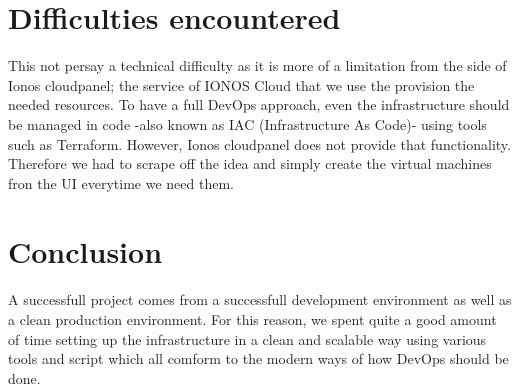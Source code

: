 \section{Difficulties encountered}
This not persay a technical difficulty as it is more of a limitation from the side of Ionos cloudpanel; the service of IONOS Cloud that we use the provision the needed resources.
To have a full DevOps approach, even the infrastructure should be managed in code -also known as IAC (Infrastructure As Code)- using tools such as Terraform.
However, Ionos cloudpanel does not provide that functionality.
Therefore we had to scrape off the idea and simply create the virtual machines fron the UI everytime we need them.

\setcounter{secnumdepth}{0} %
\section{Conclusion}
A successfull project comes from a successfull development environment as well as a clean production environment.
For this reason, we spent quite a good amount of time setting up the infrastructure in a clean and scalable way using various tools and script which all comform to the modern ways of how DevOps should be done.
